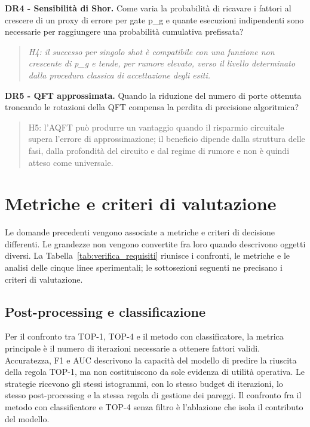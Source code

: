 \textbf{DR4 - Sensibilità di Shor.} Come varia la probabilità di ricavare i fattori al crescere di un proxy di errore per gate p\_g e quante esecuzioni indipendenti sono necessarie per raggiungere una probabilità cumulativa prefissata?

\begin{quote}
\emph{H4: il successo per singolo shot è compatibile con una funzione non crescente di p\_g e tende, per rumore elevato, verso il livello determinato dalla procedura classica di accettazione degli esiti.}
\end{quote}

\textbf{DR5 - QFT approssimata.} Quando la riduzione del numero di porte ottenuta troncando le rotazioni della QFT compensa la perdita di precisione algoritmica?

\begin{quote}
H5: l'AQFT può produrre un vantaggio quando il risparmio circuitale supera l'errore di approssimazione; il beneficio dipende dalla struttura delle fasi, dalla profondità del circuito e dal regime di rumore e non è quindi atteso come universale. \cite{barencoAQFT1996,akoramurthy2026}
\end{quote}

\section{Metriche e criteri di valutazione}\label{sec:finale_2_5}\label{sec:metriche}\label{sec:finale_2_6}

Le domande precedenti vengono associate a metriche e criteri di decisione differenti. Le grandezze non vengono convertite fra loro quando descrivono oggetti diversi. La Tabella~\ref{tab:verifica_requisiti} riunisce i confronti, le metriche e le analisi delle cinque linee sperimentali; le sottosezioni seguenti ne precisano i criteri di valutazione.

\subsection{Post-processing e classificazione}\label{sec:finale_2_6_1}

Per il confronto tra TOP-1, TOP-4 e il metodo con classificatore, la metrica principale è il numero di iterazioni necessarie a ottenere fattori validi. Accuratezza, F1 e AUC descrivono la capacità del modello di predire la riuscita della regola TOP-1, ma non costituiscono da sole evidenza di utilità operativa. Le strategie ricevono gli stessi istogrammi, con lo stesso budget di iterazioni, lo stesso post-processing e la stessa regola di gestione dei pareggi. Il confronto fra il metodo con classificatore e TOP-4 senza filtro è l'ablazione che isola il contributo del modello. \cite{yang2026}

